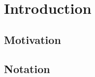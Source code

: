 \section{Introduction}
    \subsection{Motivation}
    
    \pagebreak
    \subsection{Notation}
    